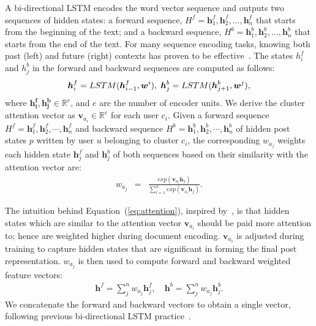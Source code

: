\documentclass{bmcart}
\begin{document}
A bi-directional LSTM encodes the word 
vector sequence and outputs two sequences of hidden states: a forward sequence,
$H^f={\boldsymbol{h}^f_1, \boldsymbol{h}^f_2,\ldots,
  \boldsymbol{h}^f_n}$ that starts from the beginning of the text; and
a backward sequence, $H^b={\boldsymbol{h}^b_1,
  \boldsymbol{h}^b_2,\ldots, \boldsymbol{h}^b_n}$ that starts from the
end of the text. For many sequence encoding tasks, knowing both past
(left) and future (right) contexts has proven to be effective~\cite{dyer2015transition}. The states $h^f_i$ and $h^b_j$ in
the forward and backward sequences are computed as follows:
\begin{eqnarray}
  \boldsymbol{h}^f_i=LSTM(\boldsymbol{h}^f_{i-1}, \boldsymbol{w}^i),
  \hspace{1mm}\boldsymbol{h}^b_j=LSTM(\boldsymbol{h}^b_{j+1}, \boldsymbol{w}^j), \nonumber 
\end{eqnarray}
where $\boldsymbol{h^f_i}, \boldsymbol{h^b_j}\in \mathbb{R}^e$, and
$e$ are the number of encoder units. We derive the cluster attention vector as
$\boldsymbol{v}_{a_i}\in\mathbb{R}^e$ for each user $c_i$. Given a forward sequence $H^f={\boldsymbol{h}^f_1, \boldsymbol{h}^f_2,\cdots,
  \boldsymbol{h}^f_n}$ and backward sequence $H^b={\boldsymbol{h}^b_1,
  \boldsymbol{h}^b_2,\cdots, \boldsymbol{h}^b_n}$ of hidden 
post states $p$ written by user $u$ belonging to cluster $c_i$, the
corresponding $w_{a_{j}}$ weights each hidden state $\boldsymbol{h}^f_j$ and
$\boldsymbol{h}^b_j$ of both sequences based on
their similarity with the attention vector are:
\begin{eqnarray}\label{eq:attention}
  w_{a_j}&=&\frac{exp(\boldsymbol{v}_{a_i}  \boldsymbol{h}_j)}{\sum^n_{l=1}exp(\boldsymbol{v}_{a_i} \boldsymbol{h}_j)}. 
\end{eqnarray}

The intuition behind Equation~(\ref{eq:attention}), inspired by~\cite{luong2015effective}, is that hidden states which are similar to
the attention vector $\boldsymbol{v}_{a_{i}}$ should be paid more
attention to; hence are weighted higher during document
encoding. $\boldsymbol{v}_{a_{i}}$ is adjusted during training to
capture hidden states that are significant in forming the final post
representation. $w_{a_j}$ is then used to compute forward and backward
weighted feature vectors:
\begin{eqnarray}\label{eq:w_sum}
  \boldsymbol{h}^f=\sum^n_j w_{a_j} \boldsymbol{h}^f_j, 
  \quad\boldsymbol{h}^b=\sum^n_j w_{a_j} \boldsymbol{h}^b_j. 
\end{eqnarray}
We concatenate the forward and backward vectors to obtain a single
vector, following previous bi-directional LSTM practice~\cite{ma2016end}. \\
\end{document}
